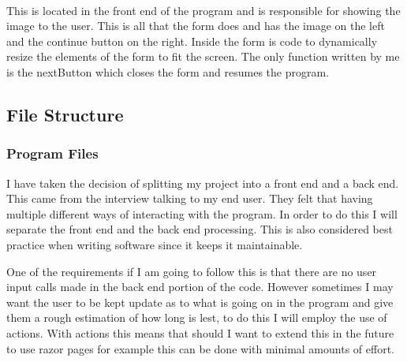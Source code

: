 \begin{FlushLeft}
    \begin{figure}[H]
        \centering
    \end{figure}\\

    This is located in the front end of the program and is responsible for showing the image to the user. This is all that the form does and has the image on the left and the continue button on the right. Inside the form is code to dynamically resize the elements of the form to fit the screen. The only function written by me is the nextButton which closes the form and resumes the program.

    \BK

    \subsection{File Structure}
    \subsubsection{Program Files}
    I have taken the decision of splitting my project into a front end and a back end. This came from the interview talking to my end user. They felt that having multiple different ways of interacting with the program. In order to do this I will separate the front end and the back end processing. This is also considered best practice when writing software since it keeps it maintainable. \\ \bk
    
    One of the requirements if I am going to follow this is that there are no user input calls made in the back end portion of the code. However sometimes I may want the user to be kept update as to what is going on in the program and give them a rough estimation of how long is lest, to do this I will employ the use of actions. With actions this means that should I want to extend this in the future to use razor pages for example this can be done with minimal amounts of effort. \\ \bk


\end{FlushLeft}
